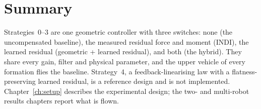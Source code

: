\section{Summary}
\label{sec:ctrl-summary}

Strategies~0--3 are one geometric controller with three switches: none (the uncompensated
baseline), the measured residual force and moment (INDI), the learned residual (geometric + learned
residual), and both (the hybrid). They share every gain, filter and physical parameter, and the
upper vehicle of every formation flies the baseline. Strategy~4, a feedback-linearising law with a
flatness-preserving learned residual, is a reference design and is not implemented.
Chapter~\ref{ch:setup} describes the experimental design; the two- and multi-robot results chapters
report what is flown.
